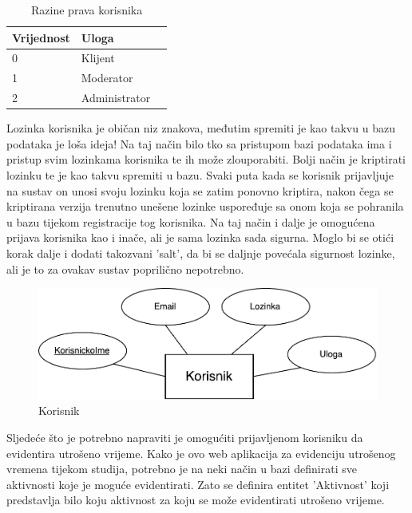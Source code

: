 \documentclass[times, utf8, zavrsni]{fer}
\begin{document}
\begin{table}[H]
\caption{Razine prava korisnika}
\label{tbl:razine_prava}
\centering
\begin{tabular}{llr} \hline
Vrijednost & Uloga\\ \hline
0 & Klijent \\
1 & Moderator \\
2 & Administrator \\ \hline
\end{tabular}
\end{table}

Lozinka korisnika je običan niz znakova, međutim spremiti je kao takvu u bazu podataka je loša ideja! Na taj način bilo tko sa pristupom bazi podataka ima i pristup svim lozinkama korisnika te ih može zlouporabiti. Bolji način je kriptirati lozinku te je kao takvu spremiti u bazu. Svaki puta kada se korisnik prijavljuje na sustav on unosi svoju lozinku koja se zatim ponovno kriptira, nakon čega se kriptirana verzija trenutno unešene lozinke uspoređuje sa onom koja se pohranila u bazu tijekom registracije tog korisnika. Na taj način i dalje je omogućena prijava korisnika kao i inače, ali je sama lozinka sada sigurna. Moglo bi se otići korak dalje i dodati takozvani 'salt', da bi se daljnje povećala sigurnost lozinke, ali je to za ovakav sustav poprilično nepotrebno.\\

\begin{figure}[H]
\centering
\includegraphics[width=\textwidth,height=\textheight,keepaspectratio]{img/korisnik.pdf}
\caption{Korisnik}
\label{fig:korisnik}
\end{figure}

Sljedeće što je potrebno napraviti je omogućiti prijavljenom korisniku da evidentira utrošeno vrijeme. Kako je ovo web aplikacija za evidenciju utrošenog vremena tijekom studija, potrebno je na neki način u bazi definirati sve aktivnosti koje je moguće evidentirati. Zato se definira entitet 'Aktivnost' koji predstavlja bilo koju aktivnost za koju se može evidentirati utrošeno vrijeme. \\
\end{document}
